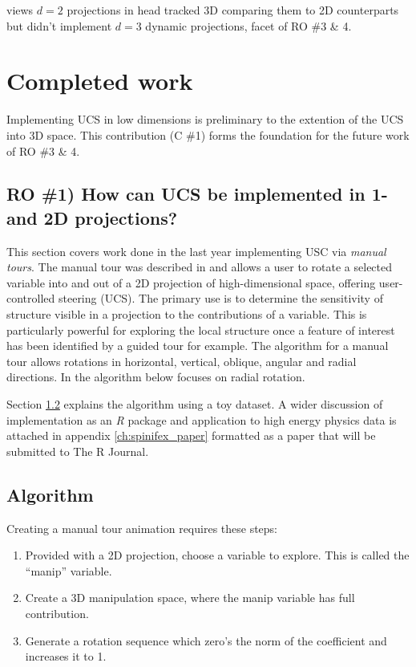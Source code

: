 \documentclass{monashthesis}
\begin{document}
\textcite{nelson_xgobi_1998} views \(d=2\) projections in head tracked
3D comparing them to 2D counterparts but didn't implement \(d=3\)
dynamic projections, facet of RO \#3 \& 4.

\chapter{Completed work}\label{ch:completed_work}

Implementing UCS in low dimensions is preliminary to the extention of
the UCS into 3D space. This contribution (C \#1) forms the foundation
for the future work of RO \#3 \& 4.

\section{RO \#1) How can UCS be implemented in 1- and 2D
projections?}\label{ro-1-how-can-ucs-be-implemented-in-1--and-2d-projections}

This section covers work done in the last year implementing USC via
\emph{manual tours}. The manual tour was described in
\textcite{cook_manual_1997} and allows a user to rotate a selected
variable into and out of a 2D projection of high-dimensional space,
offering user-controlled steering (UCS). The primary use is to determine
the sensitivity of structure visible in a projection to the
contributions of a variable. This is particularly powerful for exploring
the local structure once a feature of interest has been identified by a
guided tour \autocite{cook_grand_1995} for example. The algorithm for a
manual tour allows rotations in horizontal, vertical, oblique, angular
and radial directions. In the algorithm below focuses on radial
rotation.

Section \ref{sec:algorithm} explains the algorithm using a toy dataset.
A wider discussion of implementation as an \emph{R} package and
application to high energy physics data is attached in appendix
\ref{ch:spinifex_paper} formatted as a paper that will be submitted to
The R Journal.

\section{Algorithm}\label{sec:algorithm}

Creating a manual tour animation requires these steps:

\begin{enumerate}
\def\labelenumi{\arabic{enumi}.}
\tightlist
\item
  Provided with a 2D projection, choose a variable to explore. This is
  called the ``manip'' variable.
\item
  Create a 3D manipulation space, where the manip variable has full
  contribution.
\item
  Generate a rotation sequence which zero's the norm of the coefficient
  and increases it to 1.
\end{enumerate}
\end{document}
